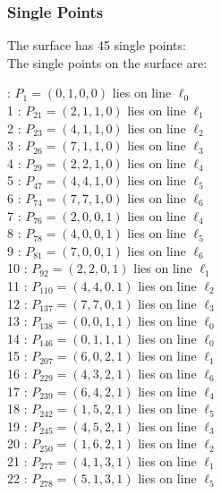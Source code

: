 \documentclass{article}
\begin{document}
{\subsubsection*{Single Points}
The surface has 45 single points:\\
The single points on the surface are:\\
\begin{multicols}{2}
 : $P_{1}=( 0, 1, 0, 0 )$ lies on line $\ell_{0}$\\
1 : $P_{21}=( 2, 1, 1, 0 )$ lies on line $\ell_{1}$\\
2 : $P_{23}=( 4, 1, 1, 0 )$ lies on line $\ell_{2}$\\
3 : $P_{26}=( 7, 1, 1, 0 )$ lies on line $\ell_{3}$\\
4 : $P_{29}=( 2, 2, 1, 0 )$ lies on line $\ell_{4}$\\
5 : $P_{47}=( 4, 4, 1, 0 )$ lies on line $\ell_{5}$\\
6 : $P_{74}=( 7, 7, 1, 0 )$ lies on line $\ell_{6}$\\
7 : $P_{76}=( 2, 0, 0, 1 )$ lies on line $\ell_{4}$\\
8 : $P_{78}=( 4, 0, 0, 1 )$ lies on line $\ell_{5}$\\
9 : $P_{81}=( 7, 0, 0, 1 )$ lies on line $\ell_{6}$\\
10 : $P_{92}=( 2, 2, 0, 1 )$ lies on line $\ell_{1}$\\
11 : $P_{110}=( 4, 4, 0, 1 )$ lies on line $\ell_{2}$\\
12 : $P_{137}=( 7, 7, 0, 1 )$ lies on line $\ell_{3}$\\
13 : $P_{138}=( 0, 0, 1, 1 )$ lies on line $\ell_{0}$\\
14 : $P_{146}=( 0, 1, 1, 1 )$ lies on line $\ell_{0}$\\
15 : $P_{207}=( 6, 0, 2, 1 )$ lies on line $\ell_{1}$\\
16 : $P_{229}=( 4, 3, 2, 1 )$ lies on line $\ell_{6}$\\
17 : $P_{239}=( 6, 4, 2, 1 )$ lies on line $\ell_{4}$\\
18 : $P_{242}=( 1, 5, 2, 1 )$ lies on line $\ell_{5}$\\
19 : $P_{245}=( 4, 5, 2, 1 )$ lies on line $\ell_{3}$\\
20 : $P_{250}=( 1, 6, 2, 1 )$ lies on line $\ell_{2}$\\
21 : $P_{277}=( 4, 1, 3, 1 )$ lies on line $\ell_{1}$\\
22 : $P_{278}=( 5, 1, 3, 1 )$ lies on line $\ell_{5}$\\

\end{multicols}}
\end{document}
